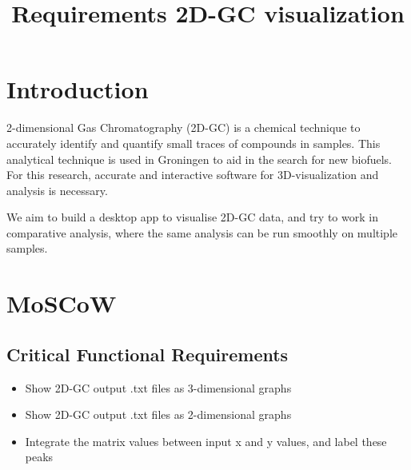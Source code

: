 \documentclass{article}
\title{Requirements 2D-GC visualization}
\author{}
\date{}
\begin{document}
\maketitle

\section{Introduction}

2-dimensional Gas Chromatography (2D-GC) is a chemical technique to accurately identify and quantify small traces of compounds in samples. This analytical technique is used in Groningen to aid in the search for new biofuels. For this research, accurate and interactive software for 3D-visualization and analysis is necessary. 

We aim to build a desktop app to visualise 2D-GC data, and try to work in comparative analysis, where the same analysis can be run smoothly on multiple samples. 

\section{MoSCoW}
\subsection*{Critical Functional Requirements}
\begin{itemize}
	\item Show 2D-GC output .txt files as 3-dimensional graphs
	\item Show 2D-GC output .txt files as 2-dimensional graphs
    \item Integrate the matrix values between input x and y values, and label these peaks
\end{itemize}
\end{document}
